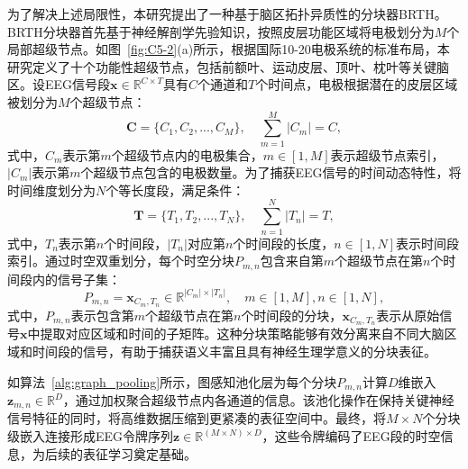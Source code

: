 为了解决上述局限性，本研究提出了一种基于脑区拓扑异质性的分块器BRTH。BRTH分块器首先基于神经解剖学先验知识，按照皮层功能区域将电极划分为$M$个局部超级节点。如图~\ref{fig:C5-2}(a)所示，根据国际10-20电极系统的标准布局，本研究定义了十个功能性超级节点，包括前额叶、运动皮层、顶叶、枕叶等关键脑区。设EEG信号段$\mathbf{x} \in \mathbb{R}^{C\times T}$具有$C$个通道和$T$个时间点，电极根据潜在的皮层区域被划分为$M$个超级节点：
\begin{equation}
\mathbf{C} = \{{C}_1,{C}_2,...,{C}_M\},\quad \sum_{m=1}^{M}|{C}_m|=C,
\end{equation}
式中，${C}_m$表示第$m$个超级节点内的电极集合，$m \in [1, M]$表示超级节点索引，$|{C}_m|$表示第$m$个超级节点包含的电极数量。为了捕获EEG信号的时间动态特性，将时间维度划分为$N$个等长度段，满足条件：
\begin{equation}
\mathbf{T} = \{T_1, T_2, ..., T_N\}, \quad \sum_{n=1}^{N}|{T}_n|=T,
\end{equation}
式中，$T_n$表示第$n$个时间段，$|{T}_n|$对应第$n$个时间段的长度，$n \in [1, N]$表示时间段索引。通过时空双重划分，每个时空分块$P_{m,n}$包含来自第$m$个超级节点在第$n$个时间段内的信号子集：
\begin{equation}
P_{m,n} = \mathbf{x}_{{C}_m,{T}_n} \in \mathbb{R}^{|{C}_m|\times |{T}_n|}, \quad m \in [1, M], n \in [1, N],
\end{equation}
式中，$P_{m,n}$表示包含第$m$个超级节点在第$n$个时间段的分块，$\mathbf{x}_{{C}_m,{T}_n}$表示从原始信号$\mathbf{x}$中提取对应区域和时间的子矩阵。这种分块策略能够有效分离来自不同大脑区域和时间段的信号，有助于捕获语义丰富且具有神经生理学意义的分块表征。



如算法~\ref{alg:graph_pooling}所示，图感知池化层为每个分块$P_{m,n}$计算$D$维嵌入$\mathbf{z}_{m,n} \in \mathbb{R}^{D}$，通过加权聚合超级节点内各通道的信息。该池化操作在保持关键神经信号特征的同时，将高维数据压缩到更紧凑的表征空间中。最终，将$M\times N$个分块级嵌入连接形成EEG令牌序列$\mathbf{z} \in \mathbb{R}^{(M\times N) \times D}$，这些令牌编码了EEG段的时空信息，为后续的表征学习奠定基础。

